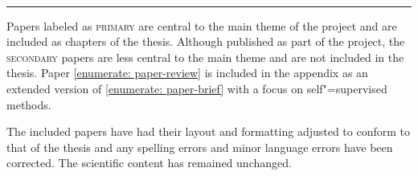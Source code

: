 \vspace{5mm}

\raggedright\par\noindent\hspace{8mm}{\Large\scshape secondary}\\[-2mm]

\raggedleft\rule{\textwidth - 8mm}{0.4pt}

\begin{enumerate}[leftmargin=8mm,topsep=0mm,label={[\Alph*]}]
    \setcounter{enumi}{6}
    \item {} \shared \label{enumerate: paper-review}
    \item {} \co
    \item {} \co %
\end{enumerate}

\justifying

\vspace{5mm}

\noindent Papers labeled as \textsc{primary} are central to the main theme of the project and are included as chapters of the thesis. 
Although published as part of the project, the \textsc{secondary} papers are less central to the main theme and are not included in the thesis. 
Paper \ref{enumerate: paper-review} is included in the appendix as an extended version of \ref{enumerate: paper-brief} with a focus on self"=supervised methods. 

\vspace{3mm}

\noindent The included papers have had their layout and formatting adjusted to conform to that of the thesis and any spelling errors and minor language errors have been corrected. The scientific content has remained unchanged.

\vspace*{\fill}
